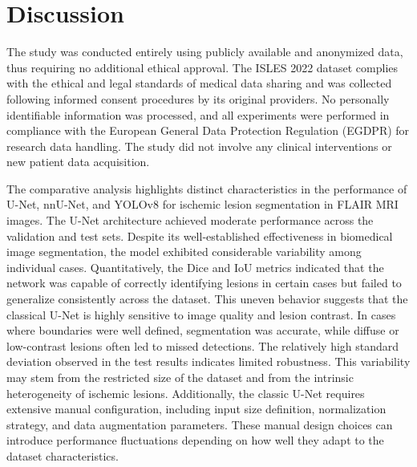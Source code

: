 \documentclass[12pt]{article}
\begin{document}
\section{Discussion}\label{sec:discussion}


The study was conducted entirely using publicly available and anonymized data, thus requiring no additional ethical approval. The ISLES 2022 dataset complies with the ethical and legal standards of medical data sharing and was collected following informed consent procedures by its original providers.
%
No personally identifiable information was processed, and all experiments were performed in compliance with the European General Data Protection Regulation (EGDPR) for research data handling. The study did not involve any clinical interventions or new patient data acquisition.

The comparative analysis highlights distinct characteristics in the performance of U-Net, nnU-Net, and YOLOv8 for ischemic lesion segmentation in FLAIR MRI images.
%
The U-Net architecture achieved moderate performance across the validation and test sets. Despite its well-established effectiveness in biomedical image segmentation, the model exhibited considerable variability among individual cases. Quantitatively, the Dice and IoU metrics indicated that the network was capable of correctly identifying lesions in certain cases but failed to generalize consistently across the dataset. This uneven behavior suggests that the classical U-Net is highly sensitive to image quality and lesion contrast. In cases where boundaries were well defined, segmentation was accurate, while diffuse or low-contrast lesions often led to missed detections.
%
The relatively high standard deviation observed in the test results indicates limited robustness. This variability may stem from the restricted size of the dataset and from the intrinsic heterogeneity of ischemic lesions. Additionally, the classic U-Net requires extensive manual configuration, including input size definition, normalization strategy, and data augmentation parameters. These manual design choices can introduce performance fluctuations depending on how well they adapt to the dataset characteristics.
\end{document}
